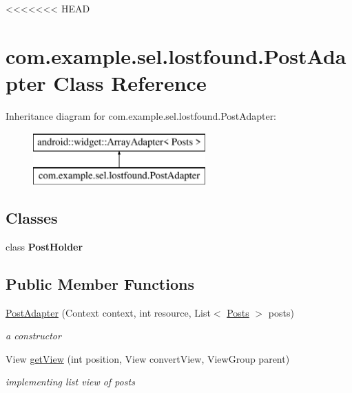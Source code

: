 <<<<<<< HEAD
\hypertarget{classcom_1_1example_1_1sel_1_1lostfound_1_1PostAdapter}{\section{com.\-example.\-sel.\-lostfound.\-Post\-Adapter Class Reference}
\label{classcom_1_1example_1_1sel_1_1lostfound_1_1PostAdapter}
}
Inheritance diagram for com.\-example.\-sel.\-lostfound.\-Post\-Adapter\-:\begin{figure}[H]
\begin{center}
\leavevmode
\includegraphics[height=2.000000cm]{classcom_1_1example_1_1sel_1_1lostfound_1_1PostAdapter}
\end{center}
\end{figure}
\subsection*{Classes}
\begin{DoxyCompactItemize}
\item 
class {\bfseries Post\-Holder}
\end{DoxyCompactItemize}
\subsection*{Public Member Functions}
\begin{DoxyCompactItemize}
\item 
\hypertarget{classcom_1_1example_1_1sel_1_1lostfound_1_1PostAdapter_a58de5e8d3132dd70bfd35dcb44bf80e1}{\hyperlink{classcom_1_1example_1_1sel_1_1lostfound_1_1PostAdapter_a58de5e8d3132dd70bfd35dcb44bf80e1}{Post\-Adapter} (Context context, int resource, List$<$ \hyperlink{classcom_1_1example_1_1sel_1_1lostfound_1_1Posts}{Posts} $>$ posts)}\label{classcom_1_1example_1_1sel_1_1lostfound_1_1PostAdapter_a58de5e8d3132dd70bfd35dcb44bf80e1}

\begin{DoxyCompactList}\small\item\em a constructor \end{DoxyCompactList}\item 
View \hyperlink{classcom_1_1example_1_1sel_1_1lostfound_1_1PostAdapter_aa2f3c1364857d97091ba325de3df6226}{get\-View} (int position, View convert\-View, View\-Group parent)
\begin{DoxyCompactList}\small\item\em implementing list view of posts \end{DoxyCompactList}\end{DoxyCompactItemize}


